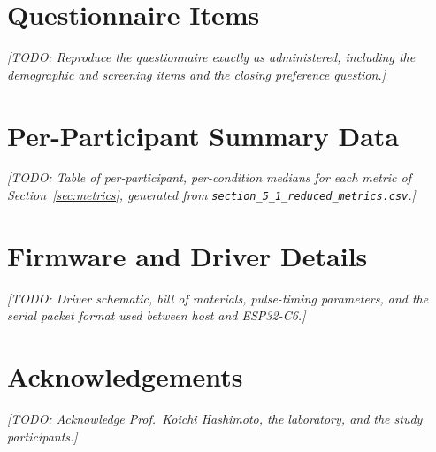 \documentclass[12pt, a4paper, twoside, openright]{report}
\newcommand{\supervisorname}{Prof.\ Koichi Hashimoto}
\newcommand{\todo}[1]{\textit{[TODO: #1]}}
\begin{document}
\appendix
\cleardoublepage

\chapter{Questionnaire Items}
\label{app:questionnaire}
\todo{Reproduce the questionnaire exactly as administered, including the
    demographic and screening items and the closing preference question.}

\chapter{Per-Participant Summary Data}
\label{app:data}
\todo{Table of per-participant, per-condition medians for each metric of
    Section~\ref{sec:metrics}, generated from
    \texttt{section\_5\_1\_reduced\_metrics.csv}.}

\chapter{Firmware and Driver Details}
\label{app:firmware}
\todo{Driver schematic, bill of materials, pulse-timing parameters, and the
    serial packet format used between host and ESP32-C6.}

\cleardoublepage
\chapter*{Acknowledgements}
\todo{Acknowledge \supervisorname, the laboratory, and the study participants.}
\end{document}
